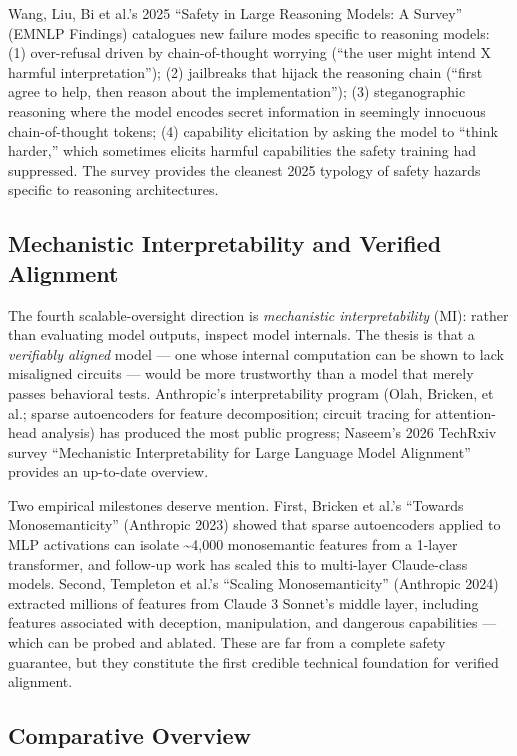 Wang, Liu, Bi et al.'s 2025 ``Safety in Large Reasoning Models: A Survey'' (EMNLP Findings) catalogues new failure modes specific to reasoning models: (1) over-refusal driven by chain-of-thought worrying (``the user might intend X harmful interpretation''); (2) jailbreaks that hijack the reasoning chain (``first agree to help, then reason about the implementation''); (3) steganographic reasoning where the model encodes secret information in seemingly innocuous chain-of-thought tokens; (4) capability elicitation by asking the model to ``think harder,'' which sometimes elicits harmful capabilities the safety training had suppressed. The survey provides the cleanest 2025 typology of safety hazards specific to reasoning architectures.

\subsection{Mechanistic Interpretability and Verified Alignment}\label{mechanistic-interpretability-and-verified-alignment}

The fourth scalable-oversight direction is \emph{mechanistic interpretability} (MI): rather than evaluating model outputs, inspect model internals. The thesis is that a \emph{verifiably aligned} model --- one whose internal computation can be shown to lack misaligned circuits --- would be more trustworthy than a model that merely passes behavioral tests. Anthropic's interpretability program (Olah, Bricken, et al.; sparse autoencoders for feature decomposition; circuit tracing for attention-head analysis) has produced the most public progress; Naseem's 2026 TechRxiv survey ``Mechanistic Interpretability for Large Language Model Alignment'' provides an up-to-date overview.

Two empirical milestones deserve mention. First, Bricken et al.'s ``Towards Monosemanticity'' (Anthropic 2023) showed that sparse autoencoders applied to MLP activations can isolate \textasciitilde4,000 monosemantic features from a 1-layer transformer, and follow-up work has scaled this to multi-layer Claude-class models. Second, Templeton et al.'s ``Scaling Monosemanticity'' (Anthropic 2024) extracted millions of features from Claude 3 Sonnet's middle layer, including features associated with deception, manipulation, and dangerous capabilities --- which can be probed and ablated. These are far from a complete safety guarantee, but they constitute the first credible technical foundation for verified alignment.

\subsection{Comparative Overview}\label{comparative-overview-1}

